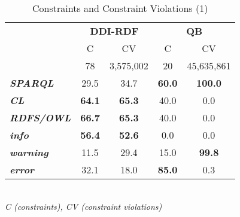 \documentclass[conference]{IEEEtran}
\begin{document}

\begin{table}[H]
		\scriptsize
    \begin{center}
		\caption{Constraints and Constraint Violations (1)}
		\label{tab:evaluation-constraint-violations-1}
    \begin{tabular}{@{}lcccc@{}}
		\hline
    \multirow{2}{*}{} &
      \multicolumn{2}{c}{\textbf{DDI-RDF}} &
      \multicolumn{2}{c}{\textbf{QB}} \\
    \textbf{} & C & CV & C & CV \\
    \hline
		 & 78 & 3,575,002 & 20 & 45,635,861 \\
		\hline
		\textbf{\emph{SPARQL}} & 29.5 & 34.7 & \textbf{60.0} & \textbf{100.0} \\
		\textbf{\emph{CL}} & \textbf{64.1} & \textbf{65.3} & 40.0 & 0.0 \\
		\textbf{\emph{RDFS/OWL}} & \textbf{66.7} & \textbf{65.3} & 40.0 & 0.0 \\
		\hline
		\textbf{\emph{info}} & \textbf{56.4} & \textbf{52.6} & 0.0 & 0.0 \\
		\textbf{\emph{warning}} & 11.5 & 29.4 & 15.0 & \textbf{99.8} \\
		\textbf{\emph{error}} & 32.1 & 18.0 & \textbf{85.0} & 0.3 \\
    \bottomrule
    \end{tabular}
    \\ \emph{C (constraints), CV (constraint violations)}
    \end{center}
\end{table}
\end{document}
